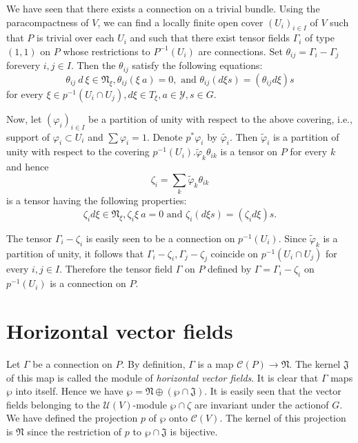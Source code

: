 We have seen that there exists a connection on a trivial bundle. Using
the paracompactness of $V$, we can find a locally finite open cover
$(U_i)_{i \in I}$ of $V$ such that $P$ is trivial over each $U_i$ and
such that there exist tensor fields $\Gamma_i$ of type $(1,1)$ on $P$
whose restrictions to $P^{-1}(U_i)$ are connections. Set $\theta_{ij}
= \Gamma_i - \Gamma_j$ for\pageoriginale every $i,j \in I$. Then the $\theta_{ij}$
satisfy the following equations: 
$$
\theta_{ij} ~ d ~ \xi \in \mathfrak{N}_\xi, \theta_{ij} (\xi ~ a) =
0,\text{ and } \theta_{ij} (d \xi s) = (\theta_{ij} d \xi) s 
$$
for every $\xi \in p^{-1}(U_i \cap U_j), d \xi \in T_\xi, a \in
\mathscr{Y}, s \in G$. 

Now, let $(\varphi_i)_{i \in I}$ be a partition of unity with respect
to the above covering, i.e., support of $\varphi_i \subset U_i$ and
$\sum \varphi_i = 1$.  Denote $p^* \varphi_i$ by
$\tilde{\varphi_i}$. Then $\tilde{\varphi}_i$ is a partition of unity
with respect to the covering $p^{-1}(U_i). \tilde{\varphi}_k
\theta_{ik}$ is a tensor on $P$ for every $k$ and hence 
$$
\zeta_i = \sum_k \tilde{\varphi}_k \theta_{ik}
$$
is a tensor having the following properties:
$$
\zeta_i d \xi \in \mathfrak{N}_\xi, \zeta_i \xi ~ a = 0 \text{ and }
\zeta_i(d \xi s ) = (\zeta_i d \xi)s. 
$$

The tensor $\Gamma_i - \zeta_i$ is easily seen to be a connection on
$p^{-1}(U_i)$. Since $\tilde{\varphi}_k$ is a partition of unity, it
follows that $\Gamma_i - \zeta_i, \Gamma_j - \zeta_j$ coincide on
$p^{-1}(U_i \cap U_j)$ for every $i,j \in I$. Therefore the tensor
field $\Gamma $ on $P$ defined by $\Gamma = \Gamma_i - \zeta_i$ on
$p^{-1}(U_i)$ is a connection on $P$. 

\section{Horizontal vector fields}\label{chap3:sec2} %

Let $\Gamma$ be a connection on $P$. By definition, $\Gamma$ is a map
$\mathscr{C}(P) \rightarrow \mathfrak{N}$. The kernel $\mathfrak{J}$
of this map is called the module of \textit{horizontal vector
  fields}. It is clear that $\Gamma$ maps $\wp$ into itself. Hence we
have $\wp = \mathfrak{N} \oplus ( \wp \cap \mathfrak{J})$. It is
easily seen that the vector fields belonging to the
$\mathscr{U}(V)$-module $\wp \cap \zeta$ are invariant under the
action\pageoriginale of $G$. We have defined the projection $p$ of $\wp$ onto
$\mathscr{C}(V)$. The kernel of this projection is $\mathfrak{N}$
since the restriction of $p$ to $\wp \cap \mathfrak{J}$ is bijective. 

